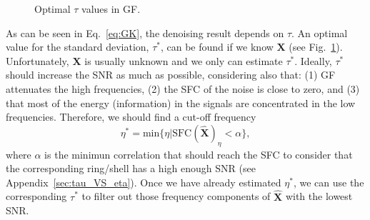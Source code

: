 \documentclass{article}
\begin{document}
\begin{figure}
  \centering
  \caption{Optimal $\tau$ values in GF.\label{fig:optimal_GF_tau}}
\end{figure}

As can be seen in Eq.~\ref{eq:GK}, the denoising result depends on
$\tau$. An optimal value for the standard deviation, $\tau^*$, can be
found if we know $\mathbf{X}$ (see
Fig.~\ref{fig:optimal_GF_tau}). Unfortunately, $\mathbf{X}$ is usually
unknown and we only can estimate $\tau^*$. Ideally, $\tau^*$ should
increase the SNR as much as possible, considering also that: (1) GF
attenuates the high frequencies, (2) the SFC of the noise is close to
zero, and (3) that most of the energy (information) in the signals are
concentrated in the low frequencies. Therefore, we should find a
cut-off frequency
\begin{equation}
  \eta^* = \text{min}\{\eta|\text{SFC}(\hat{\mathbf{X}})_\eta < \alpha\},
  \label{eq:search_eta}
\end{equation}
where $\alpha$ is the minimun correlation that should reach the SFC to consider that the corresponding ring/shell has a high enough SNR (see
Appendix~\ref{sec:tau_VS_eta}). Once we have already estimated
$\eta^*$, we can use the corresponding $\tau^*$ to filter out those
frequency components of $\hat{\mathbf{X}}$ with the lowest SNR.
\end{document}
